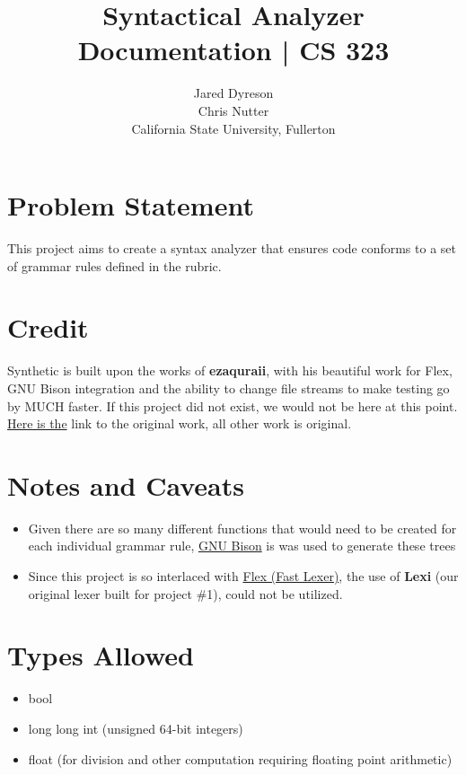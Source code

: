 \documentclass{article}
\title{Syntactical Analyzer Documentation | CS 323}
\author{Jared Dyreson\\ 
        Chris Nutter \\
        California State University, Fullerton}
\date
\begin{document}
\maketitle
\tableofcontents

\newpage

\section{Problem Statement}

This project aims to create a syntax analyzer that ensures code conforms to a set of grammar rules defined in the rubric.

\section{Credit}

Synthetic is built upon the works of \textbf{ezaquraii}, with his beautiful work for
Flex, GNU Bison integration and the ability to change file streams to make
testing go by MUCH faster. If this project did not exist, we would not be here at
this point. \href{https://github.com/ezaquarii/bison-flex-cpp-example}{Here is the} link to the original work, all other work is original.

\section{Notes and Caveats}

\begin{itemize}
\item Given there are so many different functions that would need to be created for each individual grammar rule, \href{https://www.gnu.org/software/bison/}{GNU Bison} is was used to generate these trees
\item Since this project is so interlaced with \href{https://github.com/westes/flex/blob/master/README.md}{Flex (Fast Lexer)}, the use of \textbf{Lexi} (our original lexer built for project \#1), could not be utilized.
\end{itemize}

\section{Types Allowed}

\begin{itemize}
\item bool
\item long long int (unsigned 64-bit integers)
\item float (for division and other computation requiring floating point arithmetic)
\end{itemize}
\end{document}
